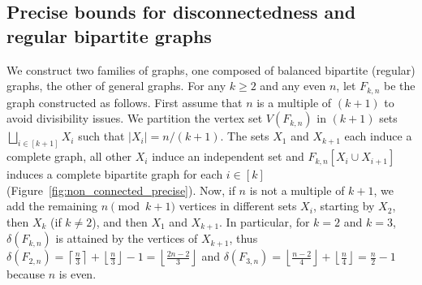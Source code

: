 \documentclass[11pt,a4paper]{article}
\theoremstyle{definition}
\begin{document}
\subsection{Precise bounds for disconnectedness and regular bipartite graphs}\label{ssec:precise}
We construct two families of graphs, one composed of balanced bipartite (regular)
graphs, the other of general graphs. For any $k \ge 2$ and any even $n$, let
$F_{k,n}$ be the graph constructed as follows.  First assume that $n$ is a
multiple of $(k+1)$ to avoid divisibility issues. We partition the vertex set
$V(F_{k,n})$ in $(k+1)$ sets $\bigsqcup_{i \in [k+1]} X_i$ such that
$|X_i| = n/(k+1)$. The sets $X_1$ and $X_{k+1}$ each induce a
complete graph, all other $X_i$ induce an independent set and
$F_{k,n}[X_i \cup X_{i+1}]$ induces a complete bipartite graph for each
$i \in [k]$ (Figure~\ref{fig:non_connected_precise}). Now, if $n$ is not a multiple of
$k+1$, we add the remaining $n \pmod{k+1}$ vertices in different sets $X_i$, starting
by $X_2$, then $X_{k}$ (if $k\neq 2$), and then $X_1$ and $X_{k+1}$. In particular, for $k = 2$ and $k=3$, $\delta(F_{k,n})$ is attained by the vertices of $X_{k+1}$, thus  $\delta(F_{2,n})= \left\lceil
  \frac{n}3 \right\rceil + \left\lfloor
  \frac{n}3 \right\rfloor-1 = \left\lfloor \frac{2n-2}3\right\rfloor$ and  $\delta(F_{3,n}) = \left\lfloor
  \frac{n-2}4 \right\rfloor + \left\lfloor
  \frac{n}4 \right\rfloor = \frac{n}2-1$ because $n$ is even.
\end{document}
